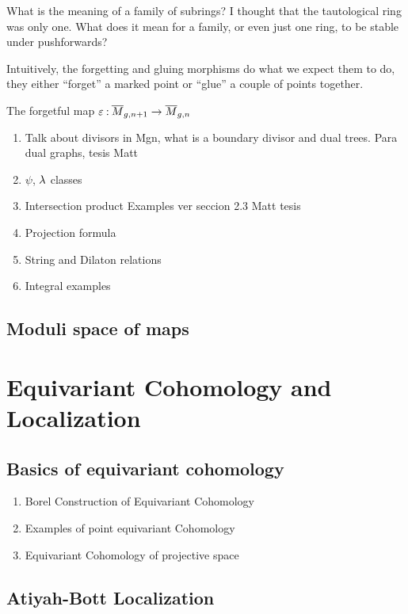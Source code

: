 \documentclass[12pt]{memoir}
\begin{document}
\begin{Qn}
What is the meaning of a family of subrings? I thought that the tautological ring was only one. What does it mean for a family, or even just one ring, to be stable under pushforwards?
\end{Qn}

Intuitively, the forgetting and gluing morphisms do what we expect them to do, they either ``forget'' a marked point or ``glue'' a couple of points together.  

\begin{Def}
    The forgetful map $\varepsilon\mathbin{:}\overline M_{g,n+1}\to\overline M_{g,n}$
\end{Def}
\begin{enumerate}
    \item Talk about divisors in Mgn, what is a boundary divisor and dual trees. Para dual graphs, tesis Matt
    \item $\psi$, $\lambda$ classes
    \item Intersection product Examples ver seccion 2.3 Matt tesis
    \item Projection formula
    \item String and Dilaton relations
    \item Integral examples
\end{enumerate}

\section{Moduli space of maps}

\chapter{Equivariant Cohomology and Localization}

\section{Basics of equivariant cohomology}
\begin{enumerate}
    \item Borel Construction of Equivariant Cohomology
    \item Examples of point equivariant Cohomology
    \item Equivariant Cohomology of projective space
\end{enumerate}

\section{Atiyah-Bott Localization}
\end{document}
